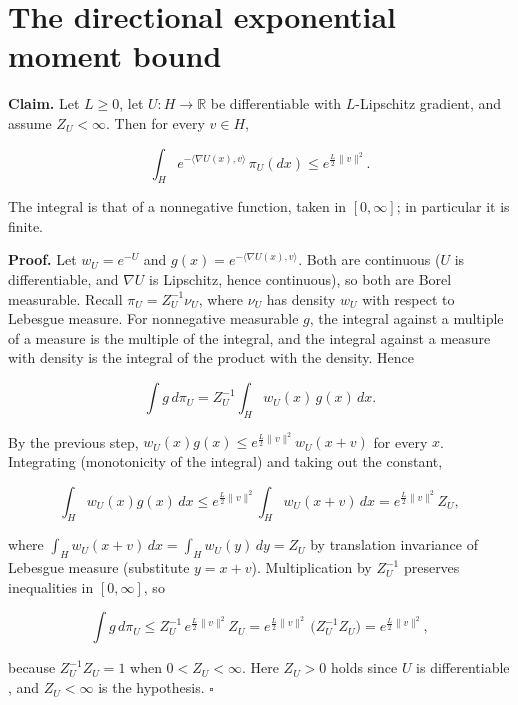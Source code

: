 \documentclass[11pt,a4paper]{article}
\begin{document}
\section{\texorpdfstring{The directional exponential moment bound}{The directional exponential moment bound}}


\textbf{Claim.} Let \(L\ge0\), let \(U:H\to\mathbb R\) be differentiable with \(L\)-Lipschitz gradient, and assume \(Z_U<\infty\). Then for every \(v\in H\),


\[\int_He^{-\langle\nabla U(x),v\rangle}\,\pi_U(dx)\le e^{\frac L2\|v\|^2}.\]


The integral is that of a nonnegative function, taken in \([0,\infty]\); in particular it is finite.




\textbf{Proof.} Let \(w_U=e^{-U}\) and \(g(x)=e^{-\langle\nabla U(x),v\rangle}\). Both are continuous (\(U\) is differentiable, and \(\nabla U\) is Lipschitz, hence continuous), so both are Borel measurable. Recall \(\pi_U=Z_U^{-1}\nu_U\), where \(\nu_U\) has density \(w_U\) with respect to Lebesgue measure. For nonnegative measurable \(g\), the integral against a multiple of a measure is the multiple of the integral, and the integral against a measure with density is the integral of the product with the density. Hence


\[\int g\,d\pi_U=Z_U^{-1}\int_Hw_U(x)\,g(x)\,dx.\]


By the previous step, \(w_U(x)g(x)\le e^{\frac L2\|v\|^2}w_U(x+v)\) for every \(x\). Integrating (monotonicity of the integral) and taking out the constant,


\[\int_Hw_U(x)g(x)\,dx\le e^{\frac L2\|v\|^2}\int_Hw_U(x+v)\,dx=e^{\frac L2\|v\|^2}Z_U,\]


where \(\int_Hw_U(x+v)\,dx=\int_Hw_U(y)\,dy=Z_U\) by translation invariance of Lebesgue measure (substitute \(y=x+v\)). Multiplication by \(Z_U^{-1}\) preserves inequalities in \([0,\infty]\), so


\[\int g\,d\pi_U\le Z_U^{-1}\,e^{\frac L2\|v\|^2}Z_U=e^{\frac L2\|v\|^2}\,\bigl(Z_U^{-1}Z_U\bigr)=e^{\frac L2\|v\|^2},\]


because \(Z_U^{-1}Z_U=1\) when \(0<Z_U<\infty\). Here \(Z_U>0\) holds since \(U\) is differentiable \cite[Section~3.26.9]{LangevinLean2026ULASC}, and \(Z_U<\infty\) is the hypothesis. \(\square\)
\end{document}
